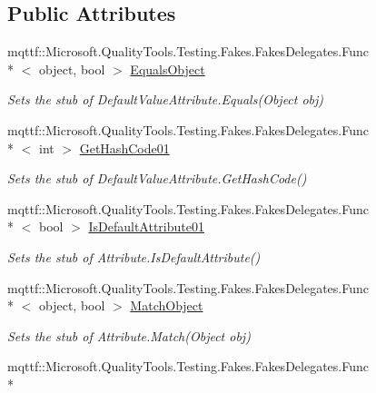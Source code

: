 \subsection*{Public Attributes}
\begin{DoxyCompactItemize}
\item 
mqttf\-::\-Microsoft.\-Quality\-Tools.\-Testing.\-Fakes.\-Fakes\-Delegates.\-Func\\*
$<$ object, bool $>$ \hyperlink{class_system_1_1_component_model_1_1_fakes_1_1_stub_default_value_attribute_a593582aaa3374fe9938a2f747bddbb7c}{Equals\-Object}
\begin{DoxyCompactList}\small\item\em Sets the stub of Default\-Value\-Attribute.\-Equals(\-Object obj)\end{DoxyCompactList}\item 
mqttf\-::\-Microsoft.\-Quality\-Tools.\-Testing.\-Fakes.\-Fakes\-Delegates.\-Func\\*
$<$ int $>$ \hyperlink{class_system_1_1_component_model_1_1_fakes_1_1_stub_default_value_attribute_a12fd1237f4cc51887e0f4d795af20671}{Get\-Hash\-Code01}
\begin{DoxyCompactList}\small\item\em Sets the stub of Default\-Value\-Attribute.\-Get\-Hash\-Code()\end{DoxyCompactList}\item 
mqttf\-::\-Microsoft.\-Quality\-Tools.\-Testing.\-Fakes.\-Fakes\-Delegates.\-Func\\*
$<$ bool $>$ \hyperlink{class_system_1_1_component_model_1_1_fakes_1_1_stub_default_value_attribute_ac4b05f9611621c226f861ac208d35344}{Is\-Default\-Attribute01}
\begin{DoxyCompactList}\small\item\em Sets the stub of Attribute.\-Is\-Default\-Attribute()\end{DoxyCompactList}\item 
mqttf\-::\-Microsoft.\-Quality\-Tools.\-Testing.\-Fakes.\-Fakes\-Delegates.\-Func\\*
$<$ object, bool $>$ \hyperlink{class_system_1_1_component_model_1_1_fakes_1_1_stub_default_value_attribute_a6974847329329947461672246782ffcf}{Match\-Object}
\begin{DoxyCompactList}\small\item\em Sets the stub of Attribute.\-Match(\-Object obj)\end{DoxyCompactList}\item 
mqttf\-::\-Microsoft.\-Quality\-Tools.\-Testing.\-Fakes.\-Fakes\-Delegates.\-Func\\*

\end{DoxyCompactItemize}
